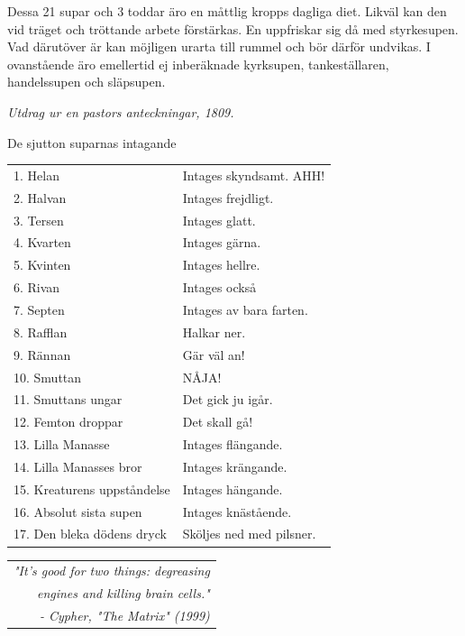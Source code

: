 \documentclass[a6paper, 10pt, twoside]{article}
\newcommand{\notis}[1]{\begin{flushright}\textit{#1}\end{flushright}}
\begin{document}
\newpage
Dessa 21 supar och 3 toddar äro en måttlig kropps dagliga diet. Likväl kan den vid träget och tröttande arbete förstärkas. En uppfriskar sig då med styrkesupen. Vad därutöver är kan möjligen urarta till rummel och bör därför undvikas. I ovanstående äro emellertid ej inberäknade kyrksupen, tankeställaren, handelssupen och släpsupen.
\vspace{-5pt}
\notis{Utdrag ur en pastors anteckningar, 1809.}
\vspace{-15pt}
\begin{center}
\Large{De sjutton suparnas intagande}
\end{center}
\vspace{-15pt}
\begin{table}[!h]
\begin{tabularx}{0.85\textwidth}{l l}
\small 1. Helan&\small Intages skyndsamt. AHH! \\
\small 2. Halvan&\small Intages frejdligt.\\
\small 3. Tersen&\small Intages glatt.\\
\small 4. Kvarten&\small Intages gärna.\\
\small 5. Kvinten&\small Intages hellre.\\
\small 6. Rivan&\small Intages också\\
\small 7. Septen&\small Intages av bara farten.\\
\small 8. Rafflan&\small Halkar ner.\\
\small 9. Rännan&\small Gär väl an!\\
\small 10. Smuttan&\small NÅJA!\\
\small 11. Smuttans ungar&\small Det gick ju igår.\\
\small 12. Femton droppar&\small Det skall gå!\\
\small 13. Lilla Manasse&\small Intages flängande.\\
\small 14. Lilla Manasses bror&\small Intages krängande.\\
\small 15. Kreaturens uppståndelse&\small Intages hängande.\\
\small 16. Absolut sista supen&\small Intages knästående.\\
\small 17. Den bleka dödens dryck&\small Sköljes ned med pilsner.
\end{tabularx}
\end{table}
\vspace{-15pt}
\begin{table}[!h]
  \begin{tabular}{|r|}
\hline
\textit{"It's good for two things: degreasing}\\ \textit{engines and killing brain cells."}\\\textit{- Cypher, "The Matrix" (1999)} \\
\hline
  \end{tabular}\
\end{table}
\end{document}
